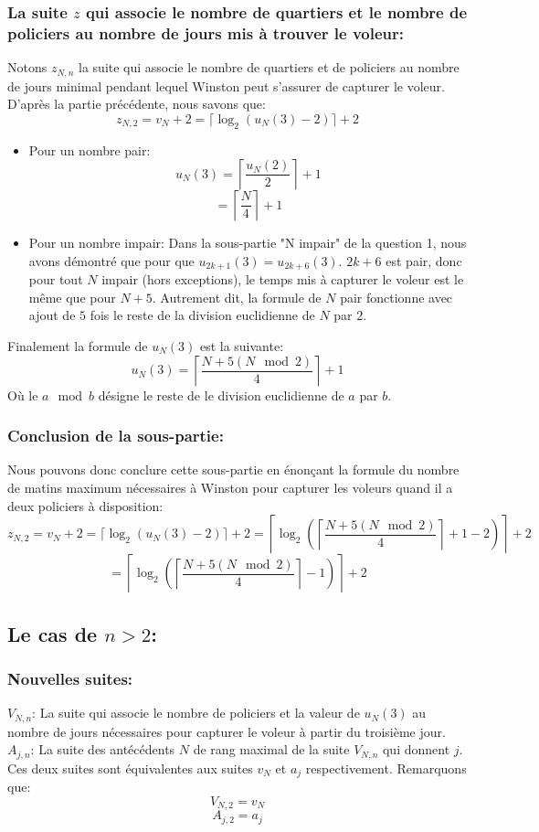 \subsubsection{La suite $z$ qui associe le nombre de quartiers et le nombre de policiers au nombre de jours mis à trouver le voleur:}
Notons $z_{N,n}$ la suite qui associe le nombre de quartiers et de policiers au nombre de jours minimal pendant lequel Winston peut s'assurer de capturer le voleur. D'après la partie précédente, nous savons que: 
$$z_{N,2}=v_N+2=\lceil\log_2(u_N(3)-2)\rceil+2$$
\begin{itemize}
    \item{Pour un nombre pair}: $$u_N(3)=\left\lceil\dfrac{u_N(2)}{2}\right\rceil+1$$
$$=\left\lceil\dfrac{N}{4}\right\rceil+1$$
    \item{Pour un nombre impair}: Dans la sous-partie "N impair" de la question 1, nous avons démontré que pour que $u_{2k+1}(3)=u_{2k+6}(3)$. $2k+6$ est pair, donc pour tout $N$ impair (hors exceptions), le temps mis à capturer le voleur est le même que pour $N+5$. Autrement dit, la formule de $N$ pair fonctionne avec ajout de $5$ fois le reste de la division euclidienne de $N$ par $2$. 
    
\end{itemize}
Finalement la formule de $u_N(3)$ est la suivante:
$$u_N(3)=\left\lceil\dfrac{N+5(N\mod 2)}{4}\right\rceil+1$$
Où le $a\mod{b}$ désigne le reste de le division euclidienne de $a$ par $b$.

\subsubsection{Conclusion de la sous-partie:}
Nous pouvons donc conclure cette sous-partie en énonçant la formule du nombre de matins maximum nécessaires à Winston pour capturer les voleurs quand il a deux policiers à disposition:
$$z_{N,2}=v_N+2=\lceil\log_2(u_N(3)-2)\rceil+2=\left\lceil\log_2\left(\left\lceil\dfrac{N+5(N\mod 2)}{4}\right\rceil+1-2\right)\right\rceil+2$$
$$=\left\lceil\log_2\left(\left\lceil\dfrac{N+5(N\mod 2)}{4}\right\rceil-1\right)\right\rceil+2$$

\subsection{Le cas de $n>2$:}
\subsubsection{Nouvelles suites:}
$V_{N,n}$: La suite qui associe le nombre de policiers et la valeur de $u_N(3)$ au nombre de jours nécessaires pour capturer le voleur à partir du troisième jour. 
$A_{j,n}$: La suite des antécédents $N$ de rang maximal de la suite $V_{N,n}$ qui donnent $j$.
Ces deux suites sont équivalentes aux suites $v_N$ et $a_j$ respectivement. Remarquons que:
$$V_{N,2}=v_N$$
$$A_{j,2}=a_j$$
